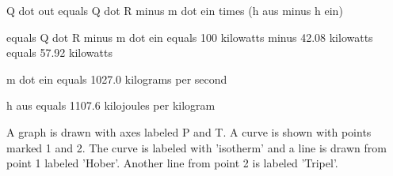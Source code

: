 Q dot out equals Q dot R minus m dot ein times (h aus minus h ein)

equals Q dot R minus m dot ein equals 100 kilowatts minus 42.08 kilowatts equals 57.92 kilowatts

m dot ein equals 1027.0 kilograms per second

h aus equals 1107.6 kilojoules per kilogram

A graph is drawn with axes labeled P and T. A curve is shown with points marked 1 and 2. The curve is labeled with 'isotherm' and a line is drawn from point 1 labeled 'Hober'. Another line from point 2 is labeled 'Tripel'.